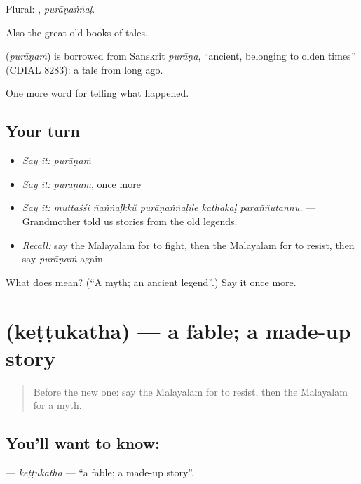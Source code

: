 Plural: , \emph{purāṇaṅṅaḷ}.

Also the great old books of tales.

\begin{cousinweb}
\textbf{} (\emph{purāṇaṁ}) is borrowed from Sanskrit \emph{purāṇa}, \textquotedblleft{}ancient, belonging to olden times\textquotedblright{} (CDIAL 8283): a tale from long ago.
\end{cousinweb}

\begin{grammarlens}[title={What you've built}]
One more word for telling what happened.
\end{grammarlens}

\subsection*{Your turn}
\begin{itemize}
\raggedright
  \item \emph{Say it:} \emph{purāṇaṁ}
  \item \emph{Say it:} \emph{purāṇaṁ}, once more
  \item \emph{Say it:} \emph{muttaśśi ñaṅṅaḷkkŭ purāṇaṅṅaḷile kathakaḷ paṟaññutannu.} — Grandmother told us stories from the old legends.
  \item \emph{Recall:} say the Malayalam for to fight, then the Malayalam for to resist, then say \emph{purāṇaṁ} again
\end{itemize}

\begin{tcolorbox}[breakable,colback=teal!4,colframe=teal!35!black,title={Before you move on}]
What does  mean? (\textquotedblleft{}A myth; an ancient legend\textquotedblright{}.) Say it once more.
\end{tcolorbox}
\section[\texorpdfstring{\ml{കെട്ടുകഥ} (keṭṭukatha)}{കെട്ടുകഥ (keṭṭukatha)}]{ (keṭṭukatha) — a fable; a made-up story}

\label{lesson:ML-C402-kettukatha}



\begin{quote}
Before the new one: say the Malayalam for to resist, then the Malayalam for a myth.
\end{quote}

\subsection*{You'll want to know: }
\textbf{} — \emph{keṭṭukatha} — \textquotedblleft{}a fable; a made-up story\textquotedblright{}.

